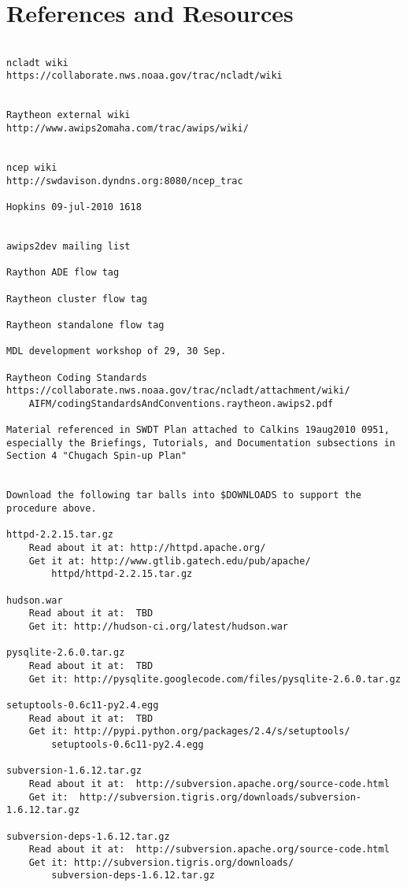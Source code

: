 
\chapter{References and Resources}
\label{ReferencesAndResources}

\begin{verbatim}

ncladt wiki
https://collaborate.nws.noaa.gov/trac/ncladt/wiki
    

Raytheon external wiki
http://www.awips2omaha.com/trac/awips/wiki/
    

ncep wiki
http://swdavison.dyndns.org:8080/ncep_trac
    
Hopkins 09-jul-2010 1618
    

awips2dev mailing list

Raython ADE flow tag

Raytheon cluster flow tag

Raytheon standalone flow tag

MDL development workshop of 29, 30 Sep.

Raytheon Coding Standards
https://collaborate.nws.noaa.gov/trac/ncladt/attachment/wiki/
    AIFM/codingStandardsAndConventions.raytheon.awips2.pdf

Material referenced in SWDT Plan attached to Calkins 19aug2010 0951,
especially the Briefings, Tutorials, and Documentation subsections in
Section 4 "Chugach Spin-up Plan"


Download the following tar balls into $DOWNLOADS to support the 
procedure above.

httpd-2.2.15.tar.gz
    Read about it at: http://httpd.apache.org/
    Get it at: http://www.gtlib.gatech.edu/pub/apache/
        httpd/httpd-2.2.15.tar.gz

hudson.war
    Read about it at:  TBD
    Get it: http://hudson-ci.org/latest/hudson.war

pysqlite-2.6.0.tar.gz
    Read about it at:  TBD
    Get it: http://pysqlite.googlecode.com/files/pysqlite-2.6.0.tar.gz

setuptools-0.6c11-py2.4.egg
    Read about it at:  TBD
    Get it: http://pypi.python.org/packages/2.4/s/setuptools/
        setuptools-0.6c11-py2.4.egg
    
subversion-1.6.12.tar.gz
    Read about it at:  http://subversion.apache.org/source-code.html
    Get it:  http://subversion.tigris.org/downloads/subversion-1.6.12.tar.gz

subversion-deps-1.6.12.tar.gz
    Read about it at:  http://subversion.apache.org/source-code.html
    Get it: http://subversion.tigris.org/downloads/
        subversion-deps-1.6.12.tar.gz


\end{verbatim}
